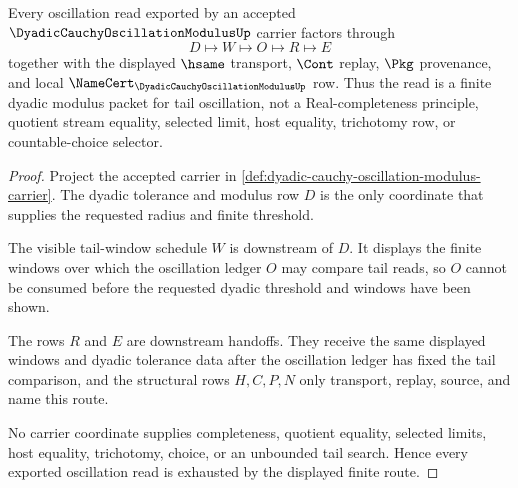 \begin{theorem}
\label{thm:dyadic-cauchy-oscillation-modulus-route}
Every oscillation read exported by an accepted $\DyadicCauchyOscillationModulusUp$ carrier factors through
$$
D\longmapsto W\longmapsto O\longmapsto R\longmapsto E
$$
together with the displayed $\hsame$ transport, $\Cont$ replay, $\Pkg$ provenance, and local $\NameCert_{\DyadicCauchyOscillationModulusUp}$ row. Thus the read is a finite dyadic modulus packet for tail oscillation, not a Real-completeness principle, quotient stream equality, selected limit, host equality, trichotomy row, or countable-choice selector.
\end{theorem}
\begin{proof}
Project the accepted carrier in \autoref{def:dyadic-cauchy-oscillation-modulus-carrier}. The dyadic tolerance and modulus row $D$ is the only coordinate that supplies the requested radius and finite threshold.

The visible tail-window schedule $W$ is downstream of $D$. It displays the finite windows over which the oscillation ledger $O$ may compare tail reads, so $O$ cannot be consumed before the requested dyadic threshold and windows have been shown.

The rows $R$ and $E$ are downstream handoffs. They receive the same displayed windows and dyadic tolerance data after the oscillation ledger has fixed the tail comparison, and the structural rows $H,C,P,N$ only transport, replay, source, and name this route.

No carrier coordinate supplies completeness, quotient equality, selected limits, host equality, trichotomy, choice, or an unbounded tail search. Hence every exported oscillation read is exhausted by the displayed finite route.
\end{proof}


